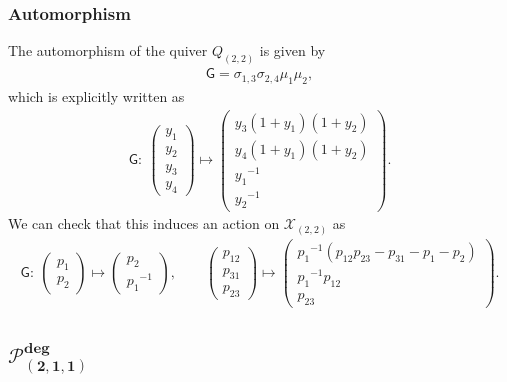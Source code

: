 \documentclass[pdftex]{sigma}
\numberwithin{equation}{section}
\begin{document}
\subsubsection*{Automorphism}
The automorphism of the quiver $Q_{(2,2)}$ is given by
\begin{gather} \label{G_22}
 \mathsf{G} = \sigma_{1,3} \sigma_{2,4} \mu_1 \mu_2 ,
\end{gather}
which is explicitly written as
\begin{gather*}
 \mathsf{G}\colon \
 \begin{pmatrix}
 y_1 \\ y_2 \\ y_3 \\ y_4
 \end{pmatrix}
 \mapsto
 \begin{pmatrix}
 y_3( 1+y_1 ) (1+y_2 ) \\
 y_4 ( 1+y_1)(1+y_2 ) \\
 {y_1}^{-1} \\
 {y_2}^{-1}
 \end{pmatrix} .
\end{gather*}
We can check that this induces an action on $\mathcal{X}_{(2,2)}$ as
\begin{gather*}
 \mathsf{G}\colon \
 \begin{pmatrix}
 p_1 \\
 p_2
 \end{pmatrix}
 \mapsto
 \begin{pmatrix}
 p_2 \\
 {p_1}^{-1}
 \end{pmatrix},
 \qquad
 \begin{pmatrix}
 p_{12} \\
 p_{31} \\
 p_{23}
 \end{pmatrix}
 \mapsto
 \begin{pmatrix}
 {p_1}^{-1}( p_{12} p_{23} - p_{31} - p_1 - p_2 ) \\
 {p_1}^{-1} p_{12} \\
 p_{23}
 \end{pmatrix} .
\end{gather*}

\subsection[$\mathcal{P}_{(2,1,1)}^{\text{deg}}$]{$\boldsymbol{\mathcal{P}_{(2,1,1)}^{\text{deg}}}$}
\end{document}
